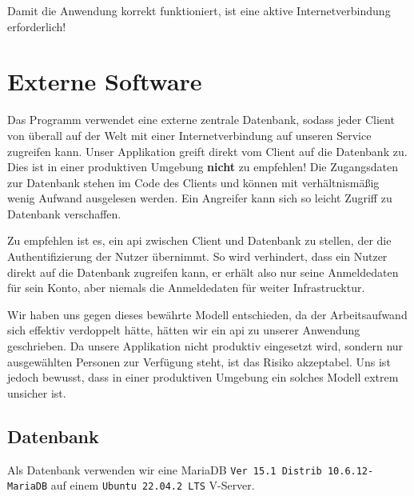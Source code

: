 \documentclass[
	12pt,
	a4paper,
	hidelinks
	]{report}
\newcommand{\code}[1]{\texttt{#1}}
\begin{document}
Damit die Anwendung korrekt funktioniert, ist eine aktive Internetverbindung erforderlich!

\section{Externe Software}
Das Programm verwendet eine externe zentrale Datenbank, sodass jeder Client von überall auf der Welt mit einer Internetverbindung auf unseren Service zugreifen kann. Unser Applikation greift direkt vom Client auf die Datenbank zu. Dies ist in einer produktiven Umgebung \textbf{nicht} zu empfehlen! Die Zugangsdaten zur Datenbank stehen im Code des Clients und können mit verhältnismäßig wenig Aufwand ausgelesen werden. Ein Angreifer kann sich so leicht Zugriff zu Datenbank verschaffen.

Zu empfehlen ist es, ein \ac{api} zwischen Client und Datenbank zu stellen, der die Authentifizierung der Nutzer übernimmt. So wird verhindert, dass ein Nutzer direkt auf die Datenbank zugreifen kann, er erhält also nur seine Anmeldedaten für sein Konto, aber niemals die Anmeldedaten für weiter Infrastrucktur.

Wir haben uns gegen dieses bewährte Modell entschieden, da der Arbeitsaufwand sich effektiv verdoppelt hätte, hätten wir ein \ac{api} zu unserer Anwendung geschrieben. Da unsere Applikation nicht produktiv eingesetzt wird, sondern nur ausgewählten Personen zur Verfügung steht, ist das Risiko akzeptabel. Uns ist jedoch bewusst, dass in einer produktiven Umgebung ein solches Modell extrem unsicher ist.
\newpage
\subsection{Datenbank}
Als Datenbank verwenden wir eine MariaDB \code{Ver 15.1 Distrib 10.6.12-MariaDB} auf einem \code{Ubuntu 22.04.2 LTS} V-Server.
\end{document}
